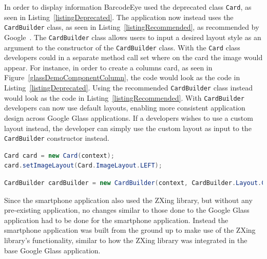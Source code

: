 In order to display information BarcodeEye used the deprecated class \texttt{Card}, as seen in Listing~\ref{listingDeprecated}. The application now instead uses the \texttt{CardBuilder} class, as seen in Listing~\ref{listingRecommended}, as recommended by Google~\cite{googleCard}. The \texttt{CardBuilder} class allows users to input a desired layout style as an argument to the constructor of the \texttt{CardBuilder} class. With the \texttt{Card} class developers could in a separate method call set where on the card the image would appear. For instance, in order to create a columns card, as seen in Figure~\ref{glassDemoComponentColumn}, the code would look as the code in Listing~\ref{listingDeprecated}. Using the recommended \texttt{CardBuilder} class instead would look as the code in Listing~\ref{listingRecommended}. With \texttt{CardBuilder} developers can now use default layouts, enabling more consistent application design across Google Glass applications. If a developers wishes to use a custom layout instead, the developer can simply use the custom layout as input to the \texttt{CardBuilder} constructor instead.

\begin{lstlisting}[language=Java, caption={Instancing of the deprecated class Card}, label=listingDeprecated]
Card card = new Card(context);
card.setImageLayout(Card.ImageLayout.LEFT);
\end{lstlisting}

\begin{lstlisting}[language=Java, caption={Instancing of the recommended class CardBuilder}, label=listingRecommended]
CardBuilder cardBuilder = new CardBuilder(context, CardBuilder.Layout.COLUMNS);
\end{lstlisting}

Since the smartphone application also used the ZXing library, but without any pre-existing application, no changes similar to those done to the Google Glass application had to be done for the smartphone application. Instead the smartphone application was built from the ground up to make use of the ZXing library's functionality, similar to how the ZXing library was integrated in the base Google Glass application.



